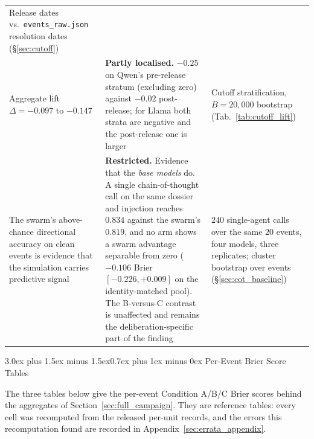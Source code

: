 \documentclass[11pt,journal,onecolumn]{IEEEtran}
\makeatletter
\renewcommand\section{\@startsection{section}{1}{\z@}%
  {3.0ex plus 1.5ex minus 1.5ex}{0.7ex plus 1ex minus 0ex}%
  {\normalfont\normalsize\centering\bfseries}}
\makeatother
\begin{document}
\begin{table}[!htbp]
\begin{tabular}{>{\raggedright\arraybackslash}p{4.4cm}>{\raggedright\arraybackslash}p{5.6cm}>{\raggedright\arraybackslash}p{5.6cm}}
Release dates vs.\ \texttt{events\_raw.json} resolution dates (\S\ref{sec:cutoff}) \\
\addlinespace
Aggregate lift $\Delta = -0.097$ to $-0.147$ &
\textbf{Partly localised.} $-0.25$ on Qwen's pre-release stratum (excluding zero) against $-0.02$ post-release; for Llama both strata are negative and the post-release one is larger &
Cutoff stratification, $B = 20{,}000$ bootstrap (Tab.~\ref{tab:cutoff_lift}) \\
\addlinespace
The swarm's above-chance directional accuracy on clean events is evidence that the simulation carries predictive signal &
\textbf{Restricted.} Evidence that the \emph{base models} do. A single chain-of-thought call on the same dossier and injection reaches $0.834$ against the swarm's $0.819$, and no arm shows a swarm advantage separable from zero ($-0.106$ Brier $[-0.226, +0.009]$ on the identity-matched pool). The B-versus-C contrast is unaffected and remains the deliberation-specific part of the finding &
$240$ single-agent calls over the same $20$ events, four models, three replicates; cluster bootstrap over events (\S\ref{sec:cot_baseline}) \\
\bottomrule
\end{tabular}
\setlength{\tabcolsep}{6pt}
\end{table}

\section{Per-Event Brier Score Tables}
\label{sec:per_event_tables}

The three tables below give the per-event Condition A/B/C Brier scores behind the aggregates of Section~\ref{sec:full_campaign}. They are reference tables: every cell was recomputed from the released per-unit records, and the errors this recomputation found are recorded in Appendix~\ref{sec:errata_appendix}.
\end{document}
